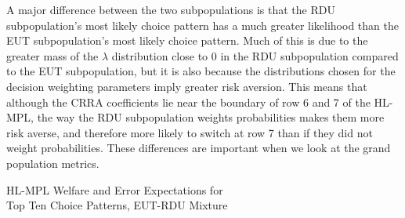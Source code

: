 \documentclass[../main.tex]{subfiles}
\begin{document}
A major difference between the two subpopulations is that the RDU subpopulation's most likely choice pattern has a much greater likelihood than the EUT subpopulation's most likely choice pattern.
Much of this is due to the greater mass of the $\lambda$ distribution close to $0$ in the RDU subpopulation compared to the EUT subpopulation, but it is also because the distributions chosen for the decision weighting parameters imply greater risk aversion.
This means that although the CRRA coefficients lie near the boundary of row 6 and 7 of the HL-MPL, the way the RDU subpopulation weights probabilities makes them more risk averse, and therefore more likely to switch at row 7 than if they did not weight probabilities.
These differences are important when we look at the grand population metrics.

\begin{table}[ht]
	\centering
	\caption{HL-MPL Welfare and Error Expectations for\\Top Ten Choice Patterns, EUT-RDU Mixture}
	\label{tb:TopTenMIX}
	\begin{adjustbox}{width=1\textwidth}
	\end{adjustbox}
\end{table}
\end{document}
